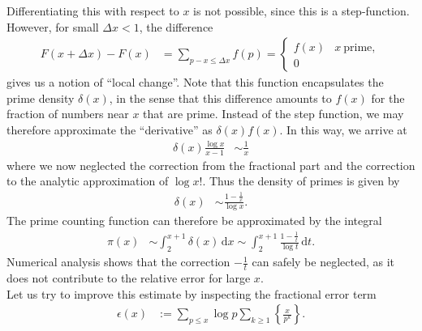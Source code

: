 \documentclass[english, parskip=full]{scrartcl}
\newcommand{\intx}{}
\newcommand{\klammer}{}
\newcommand{\tecxt}{}
\begin{document}
Differentiating this with respect to $x$ is not possible, since this is a step-function.
However, for small $\Delta x<1$, the difference
\begin{align}
F(x+\Delta x) - F(x)  &= \sum_{p-x\le \Delta x} f(p) = \begin{cases} f(x) & x\ \tecxt\text{prime},\\ 0 \end{cases}
\end{align}
gives us a notion of ``local change''.
Note that this function encapsulates the prime density $\delta(x)$, in the sense that this difference amounts to $f(x)$ for the fraction of numbers near $x$ that are prime.
Instead of the step function, we may therefore approximate the ``derivative'' as $\delta(x)f(x)$.
In this way, we arrive at
\begin{align}
\delta(x) \frac{\log x}{x-1} &\sim \frac{1}{x}
\end{align}
where we now neglected the correction from the fractional part and the correction to the analytic approximation of $\log x!$.
Thus the density of primes is given by
\begin{align}
\delta (x) &\sim \frac{1 - \frac{1}{x}}{\log x} .
\end{align}
The prime counting function can therefore be approximated by the integral
\begin{align}
\pi(x) &\sim \intx\int_{2}^{x+1} \delta(x) \, \mathrm{d}x \sim \intx\int_{2}^{x+1} \frac{1-\frac{1}{t}}{\log t} \, \mathrm{d}t.
\end{align}
Numerical analysis shows that the correction $-\frac{1}{t}$ can safely be neglected, as it does not contribute to the relative error for large $x$.
\\
Let us try to improve this estimate by inspecting the fractional error term
\begin{align}
\epsilon(x) &:= \sum_{p\le x} \log p \sum_{k\ge 1} \klammer\left\{ \frac{x}{p^k} \right\}.
\end{align}
\end{document}
